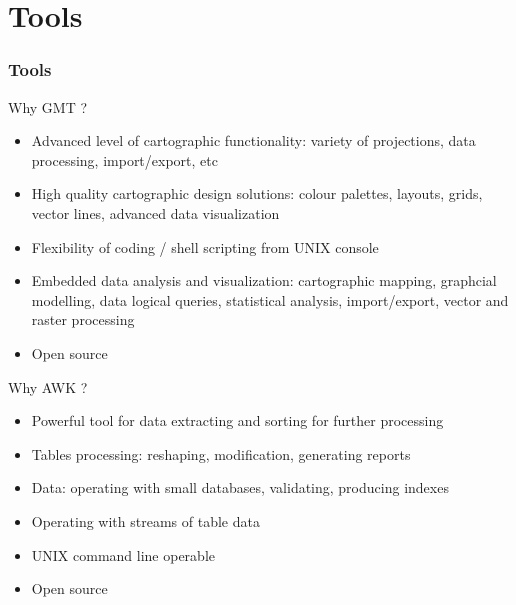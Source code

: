 \documentclass[pdflatex,compress,8pt,
	xcolor={dvipsnames,dvipsnames,svgnames,x11names,table},
	hyperref={colorlinks = true,breaklinks = true, urlcolor = NavyBlue, breaklinks = true}]{beamer}
\begin{document}
\section{Tools}
\begin{frame}\frametitle{Tools}
\vspace{1em}
\begin{alertblock}{Why GMT ?}
\begin{itemize}
	 \item Advanced level of cartographic functionality: variety of projections, data processing, import/export, etc
	 \item High quality cartographic design solutions: colour palettes, layouts, grids, vector lines, advanced data visualization
	 \item Flexibility of coding / shell scripting from UNIX console
	 \item Embedded data analysis and visualization: cartographic mapping, graphcial modelling, data logical queries, statistical analysis, import/export, vector and raster processing
	 \item Open source
\end{itemize}
\end{alertblock}
\begin{alertblock}{Why AWK ?}
\begin{itemize}
	 \item Powerful tool for data extracting and sorting for further processing
	 \item Tables processing: reshaping, modification, generating reports
	 \item Data: operating with small databases, validating, producing indexes
	 \item Operating with streams of table data
	 \item UNIX command line operable
	 \item Open source
\end{itemize}
\end{alertblock}
\end{frame}
\end{document}
